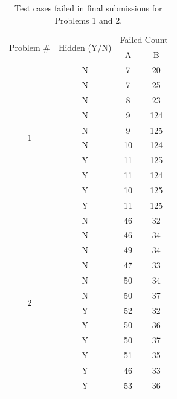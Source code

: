 \documentclass[sigconf,anonymous]{acmart}
\begin{document}
\begin{table}
\footnotesize
\caption{Test cases failed in final submissions for Problems 1 and 2.}
  \label{tab:test_cases}
  \begin{tabular}{c|c|c|c}
    \toprule
    \multirow{2}{*}{Problem \#} & \multirow{2}{*}{Hidden (Y/N)} & \multicolumn{2}{c}{Failed Count} \\
    \cmidrule{3-4}
      &   & A & B \\
    \midrule
    \multirow{10}{*}{1}& N & 7 & 20 \\
    \cmidrule{2-4}
    & N & 7 & 25 \\
    \cmidrule{2-4}
    & N & 8 & 23 \\
    \cmidrule{2-4}
    & N & 9 & 124\\
    \cmidrule{2-4}
    & N & 9 & 125\\
    \cmidrule{2-4}
    & N & 10 & 124\\
    \cmidrule{2-4}
    & Y & 11 & 125\\
    \cmidrule{2-4}
    & Y & 11 & 124\\
    \cmidrule{2-4}
    & Y & 10 & 125 \\
    \cmidrule{2-4}
    & Y & 11 & 125\\
    \midrule
    \multirow{12}{*}{2} & N & 46 & 32 \\
    \cmidrule{2-4}
    & N & 46 & 34 \\
    \cmidrule{2-4}
    & N & 49 & 34 \\
    \cmidrule{2-4}
    & N & 47 & 33\\
    \cmidrule{2-4}
    & N & 50 & 34\\
    \cmidrule{2-4}
    & N & 50 & 37\\
    \cmidrule{2-4}
    & Y & 52 & 32\\
    \cmidrule{2-4}
    & Y & 50 & 36\\
    \cmidrule{2-4}
    & Y & 50 & 37 \\
    \cmidrule{2-4}
    & Y & 51  & 35\\
    \cmidrule{2-4}
    & Y & 46 & 33 \\
    \cmidrule{2-4}
    & Y & 53 & 36 \\
  \bottomrule
\end{tabular}
\end{table}
\end{document}
